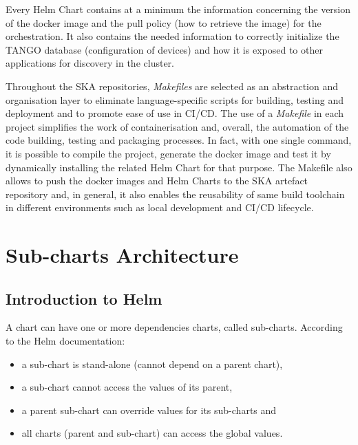 \documentclass[a4paper]{spie}  %
\begin{document}
Every Helm Chart contains at a minimum the information concerning the version of the docker image and the pull policy (how to retrieve the image) for the orchestration. It also contains the needed information to correctly initialize the TANGO database (configuration of devices) and how it is exposed to other applications for discovery in the cluster.

Throughout the SKA repositories, \textit{Makefiles} are selected as an abstraction and organisation layer to eliminate language-specific scripts for building, testing and deployment and to promote ease of use in CI/CD. The use of a \textit{Makefile} in each project simplifies the work of containerisation and, overall, the automation of the code building, testing and packaging processes. In fact, with one single command, it is possible to compile the project, generate the docker image and test it by dynamically installing the related Helm Chart for that purpose.
The Makefile also allows to push the docker images and Helm Charts to the SKA artefact repository and, in general, it also enables the reusability of same build toolchain in different environments such as local development and CI/CD lifecycle.




\section{Sub-charts Architecture}

\subsection{Introduction to Helm}
A chart can have one or more dependencies charts, called sub-charts. According to the Helm documentation:
\begin{itemize}
    \item a sub-chart is stand-alone (cannot depend on a parent chart),
    \item a sub-chart cannot access the values of its parent,
    \item a parent sub-chart can override values for its sub-charts and
    \item all charts (parent and sub-chart) can access the global values.
\end{itemize}
\end{document}
